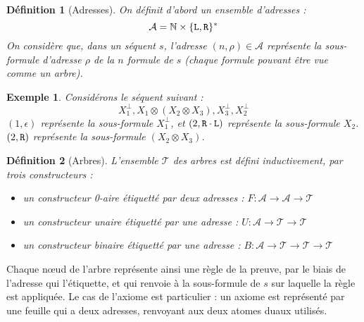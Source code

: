 \documentclass[11pt,a4paper]{article}
\newtheorem{example}{Exemple}
\newtheorem{definition}{Définition}
\newcommand*{\orth}{^\perp}
\newcommand*{\tensor}{\otimes}
\newcommand*{\Left}{\textnormal{\texttt{L}}}
\newcommand*{\Right}{\textnormal{\texttt{R}}}
\newcommand*{\trees}{\ensuremath{\mathcal{T}}}
\begin{document}
\begin{definition}[Adresses]
On définit d'abord un ensemble d'adresses :
\begin{equation*}
\mathcal{A} = \mathbb{N} \times \{ \Left, \Right\}^{*}  
\end{equation*}
On considère que, dans un séquent $s$, l'adresse $(n, \rho) \in \mathcal{A}$ représente la sous-formule d'adresse $\rho$ de la $n$\ieme{} formule de $s$ (chaque formule pouvant être vue comme un arbre).
\end{definition}

\begin{example}
Considérons le séquent suivant : 
\begin{equation*}
X_1\orth, X_1 \tensor (X_2 \tensor X_3), X_3\orth, X_2\orth
\end{equation*}
$(1, \epsilon)$ représente la sous-formule $X_1\orth$, et $(2, \Right \cdot \Left)$ représente la sous-formule $X_2$. $(2, \Right)$ représente la sous-formule $(X_2 \tensor X_3)$.
\end{example}

\begin{definition}[Arbres]
L'ensemble \trees{} des arbres est défini inductivement, par trois constructeurs :
\begin{itemize}
  \item un constructeur 0-aire étiquetté par deux adresses : $F: \mathcal{A} \rightarrow \mathcal{A} \rightarrow \trees$
  \item un constructeur unaire étiquetté par une adresse : $U: \mathcal{A} \rightarrow \trees \rightarrow \trees$
  \item un constructeur binaire étiquetté par une adresse : $B: \mathcal{A} \rightarrow \trees \rightarrow \trees \rightarrow \trees$
\end{itemize}
\end{definition}

Chaque n\oe ud de l'arbre représente ainsi une règle de la preuve, par le biais de l'adresse qui l'étiquette, et qui renvoie à la sous-formule de $s$ sur laquelle la règle est appliquée. Le cas de l'axiome est particulier : un axiome est représenté par une feuille qui a deux adresses, renvoyant aux deux atomes duaux utilisés.
\end{document}
